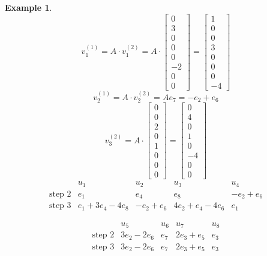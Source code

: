 \documentclass[a4paper]{article}
\newcounter{lecref}[section]
\numberwithin{lecref}{section}
\newtheorem{example}[lecref]{Example}
\begin{document}
\begin{example}
  \[
    v_1^{(1)} = A \cdot v_1^{(2)}
    = A \cdot \begin{bmatrix} 0 \\ 3 \\ 0 \\ 0 \\ 0 \\-2 \\ 0 \\ 0 \end{bmatrix}
    = \begin{bmatrix} 1 \\ 0 \\ 0 \\ 3 \\ 0 \\ 0 \\ 0 \\ -4 \end{bmatrix}
  \] \[
    v_2^{(1)} = A \cdot v_2^{(2)} = A e_7 = -e_2 + e_6
  \] \[
    v_3^{(2)} = A \cdot \begin{bmatrix} 0 \\ 0 \\ 2 \\ 0 \\ 1 \\ 0 \\ 0 \\ 0 \end{bmatrix} = \begin{bmatrix} 0 \\ 4 \\ 0 \\ 1 \\ 0 \\ -4 \\ 0 \\ 0 \end{bmatrix}
  \]
  \[\begin{array}{l|cccc}
                  & u_1 & u_2 & u_3 & u_4 \\
  \hline
    \text{step 2} & e_1 & e_4 & e_8 & -e_2+e_6 \\
    \text{step 3} & e_1+3e_4-4e_8 & -e_2+e_6 & 4e_2+e_4-4e_6 & e_1
  \end{array}\]

  \[\begin{array}{l|cccc}
                  & u_5 & u_6 & u_7 & u_8 \\
  \hline
    \text{step 2} & 3e_2-2e_6 & e_7 & 2e_3+e_5 & e_3 \\
    \text{step 3} & 3e_2-2e_6 & e_7 & 2e_3+e_5 & e_3
  \end{array}\]


\end{example}
\end{document}
